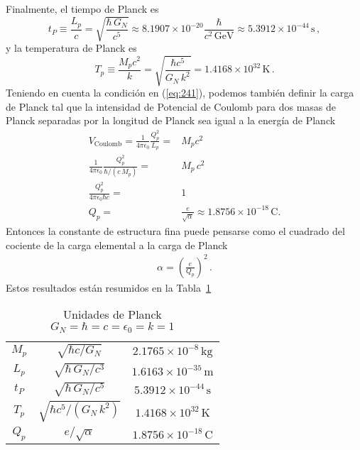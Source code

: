 Finalmente, el tiempo de Planck es
\begin{equation}
  t_P\equiv\frac{L_p}{c}=\sqrt{\frac{\hbar\, G_N}{c^5}}\approx8.1907\times10^{-20}\frac{\hbar}{c^2\,\text{GeV}}\approx5.3912\times10^{-44}\,\text{s}\,,
\end{equation}
y la temperatura de Planck es
\begin{equation}
  T_p\equiv\frac{M_p c^2}{k}=\sqrt{\frac{\hbar c^5}{G_N\,k^2}}=1.4168\times10^{32}\,\text{K}\,.
\end{equation}
Teniendo en cuenta la condición en (\ref{eq:241}), podemos también definir la carga de Planck tal que la intensidad de Potencial de Coulomb para dos masas de Planck separadas por la longitud de Planck sea igual a la energía de Planck
\begin{align}
  V_{\text{Coulomb}}=\frac{1}{4\pi\epsilon_0}\frac{Q_p^2}{L_p}=&M_pc^2\nonumber\\
  \frac{1}{4\pi\epsilon_0}\frac{Q_p^2}{\hbar/(c\,M_p)}=&M_p\,c^2\nonumber\\
  \frac{Q_p^2}{4\pi\epsilon_0\hbar c}=&1\nonumber\\
  Q_p=&\frac{e}{\sqrt{\alpha}}\approx1.8756\times10^{-18}\,\text{C}.
\end{align}
Entonces la constante de estructura fina puede pensarse como el cuadrado del cociente de la carga elemental a la carga de Planck
\begin{align}
  \alpha=\left(\frac{e}{Q_p}\right)^2\,.
\end{align}
Estos resultados est\'an resumidos en la Tabla~\ref{tab:PU}
\begin{table} %
  \centering %
  \begin{tabular}{c|c|c} %
$M_p$&$\sqrt{\hbar c/G_N}$&$2.1765\times10^{-8}\,\text{kg}$\\
$L_p$&$\sqrt{{\hbar\, G_N}/{c^3}}$&$1.6163\times10^{-35}\,\text{m}$\\
$t_P$&$\sqrt{{\hbar\, G_N}/{c^5}}$&$5.3912\times10^{-44}\,\text{s}$\\
$T_p$&$\sqrt{{\hbar c^5}/(G_N\,k^2)}$&$1.4168\times10^{32}\,\text{K}$\\
$Q_p$&${e}/{\sqrt{\alpha}}$&$1.8756\times10^{-18}\,\text{C}$\\
  \end{tabular} %
  \caption{Unidades de Planck $G_N=\hbar=c=\epsilon_0=k=1$} %
  \label{tab:PU} %
\end{table} %

